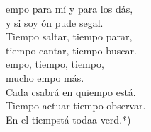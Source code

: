 \documentclass[12pt]{article}
\begin{document}
\begin{multicols*}{2}
\begin{cancion}
	\begin{chorus}%
	empo para mí y para los dás,\\
	y si soy ón pude segal.\\
	Tiempo  saltar, tiempo  parar,\\
	tiempo cantar, tiempo  buscar.\\
	empo, tiempo, tiempo,\\
	mucho empo más.\\
	Cada csabrá en quiempo está.\\
	Tiempo  actuar tiempo  observar.\\
	En el tiempstá todaa verd.*)\\
	\end{chorus}%
	\jump\\
\end{cancion}%


\end{multicols*}
\end{document}
